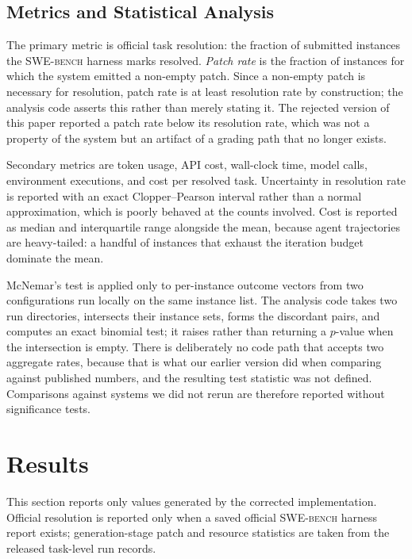 \documentclass[journal]{IEEEtran}
\newcommand{\swebench}{\textsc{SWE-bench}}
\begin{document}
\subsection{Metrics and Statistical Analysis}

The primary metric is official task resolution: the fraction of submitted instances the \swebench{} harness marks resolved. \emph{Patch rate} is the fraction of instances for which the system emitted a non-empty patch. Since a non-empty patch is necessary for resolution, patch rate is at least resolution rate by construction; the analysis code asserts this rather than merely stating it. The rejected version of this paper reported a patch rate below its resolution rate, which was not a property of the system but an artifact of a grading path that no longer exists.

Secondary metrics are token usage, API cost, wall-clock time, model calls, environment executions, and cost per resolved task. Uncertainty in resolution rate is reported with an exact Clopper--Pearson interval rather than a normal approximation, which is poorly behaved at the counts involved. Cost is reported as median and interquartile range alongside the mean, because agent trajectories are heavy-tailed: a handful of instances that exhaust the iteration budget dominate the mean.

McNemar's test is applied only to per-instance outcome vectors from two configurations run locally on the same instance list. The analysis code takes two run directories, intersects their instance sets, forms the discordant pairs, and computes an exact binomial test; it raises rather than returning a $p$-value when the intersection is empty. There is deliberately no code path that accepts two aggregate rates, because that is what our earlier version did when comparing against published numbers, and the resulting test statistic was not defined. Comparisons against systems we did not rerun are therefore reported without significance tests.

\section{Results}
\label{sec:results}

This section reports only values generated by the corrected implementation. Official resolution is reported only when a saved official \swebench{} harness report exists; generation-stage patch and resource statistics are taken from the released task-level run records.
\end{document}
